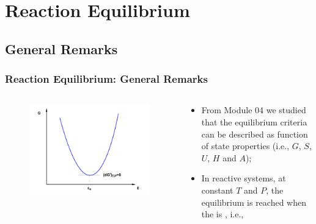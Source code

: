 \documentclass[10pt,compress,handout,unknownkeysallowed]{beamer}
\begin{document}
\section{Reaction Equilibrium}
\subsection{General Remarks}

\begin{frame}
  \frametitle{Reaction Equilibrium: General Remarks}
  \begin{columns}
     \begin{column}[l]{0.5\linewidth}\scriptsize
      \begin{figure}%
        \begin{center}
          \includegraphics[width=1.05\columnwidth,clip]{./../Pics/ChemicalReactions_GxPlot}
        \end{center}
      \end{figure}
     \end{column}
     \begin{column}[l]{0.5\linewidth}%
        \begin{itemize} 
           \item<1-> From Module 04 we studied that the equilibrium criteria can be described as function of state properties (i.e., $G$, $S$, $U$, $H$ and $A$);
           \item<2-> In reactive systems, at constant $T$ and $P$, the equilibrium is reached when the  is , i.e., 
        \end{itemize}
     \end{column}
  \end{columns}
\end{frame}
\normalsize
\end{document}
